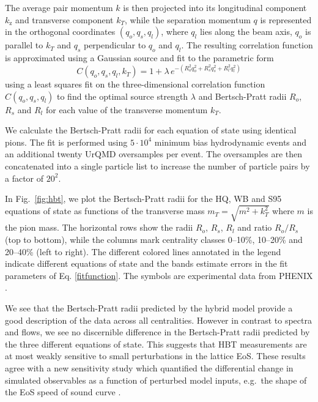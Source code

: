 \documentclass[aps,prc,reprint,amsmath,nofootinbib,superscriptaddress]{revtex4-1}
\begin{document}
The average pair momentum $k$ is then projected into its longitudinal component $k_\text{z}$ and transverse component $k_T$, while the separation momentum $q$ is represented in the orthogonal coordinates 
$(q_o, q_s, q_l)$, where $q_l$ lies along the beam axis, $q_o$ is parallel to $k_T$ and $q_s$ perpendicular to $q_o$ and $q_l$. The resulting correlation function is approximated using a Gaussian source and fit to the parametric form
\begin{equation}
 \label{fitfunction}
 C(q_o, q_s, q_l, k_T) = 1 + \lambda\, e^{-(R_o^2 q_o^2 + R_s^2 q_s^2 + R_l^2 q_l^2)}
\end{equation}
using a least squares fit on the three-dimensional correlation function $C(q_o, q_s, q_l)$ to find the optimal source strength $\lambda$ and Bertsch-Pratt radii $R_o$, $R_s$ and $R_l$ for each value of the transverse momentum $k_T$.

We calculate the Bertsch-Pratt radii for each equation of state using identical pions. The fit is performed using $5\cdot10^4$ minimum bias hydrodynamic events and an additional twenty UrQMD oversamples per event. The oversamples are then concatenated into a single particle list to increase the number of particle pairs by a factor of $20^2$.

In Fig.~\ref{fig:hbt}, we plot the Bertsch-Pratt radii for the HQ, WB and S95 equations of state as functions of the transverse mass $m_T = \sqrt{m^2 + k_T^2}$ where $m$ is the pion mass. The horizontal rows show the radii $R_o$, $R_s$, $R_l$ and ratio $R_o/R_s$ (top to bottom), while the columns mark centrality classes 0--10\%, 10--20\% and 20--40\% (left to right). The different colored lines annotated in the legend indicate different equations of state and the bands estimate errors in the fit parameters of Eq. \eqref{fitfunction}. The symbols are experimental data from PHENIX \cite{Adare:2015bcj}.

We see that the Bertsch-Pratt radii predicted by the hybrid model provide a good description of the data across all centralities. However in contrast to spectra and flows, we see no discernible difference in the Bertsch-Pratt radii predicted by the three different equations of state. This suggests that HBT measurements are at most weakly sensitive to small perturbations in the lattice EoS. These results agree with a new sensitivity study which quantified the differential change in simulated observables as a function of perturbed model inputs, e.g.\ the shape of the EoS speed of sound curve \cite{Sangaline:2015isa}. 
\end{document}
